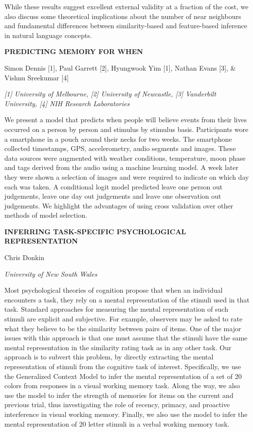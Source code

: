 \documentclass[]{article}
\begin{document}
While these results suggest excellent external validity at a fraction of
the cost, we also discuss some theoretical implications about the number
of near neighbours and fundamental differences between similarity-based
and feature-based inference in natural language concepts.

\textbf{PREDICTING MEMORY FOR WHEN}

Simon Dennis {[}1{]}, Paul Garrett {[}2{]}, Hyungwook Yim {[}1{]},
Nathan Evans {[}3{]}, \& Vishnu Sreekumar {[}4{]}

\emph{{[}1{]} University of Melbourne, {[}2{]} University of Newcastle,
{[}3{]} Vanderbilt University, {[}4{]} NIH Research Laboratories}

We present a model that predicts when people will believe events from
their lives occurred on a person by person and stimulus by stimulus
basis. Participants wore a smartphone in a pouch around their necks for
two weeks. The smartphone collected timestamps, GPS, accelerometry,
audio segments and images. These data sources were augmented with
weather conditions, temperature, moon phase and tags derived from the
audio using a machine learning model. A week later they were shown a
selection of images and were required to indicate on which day each was
taken. A conditional logit model predicted leave one person out
judgements, leave one day out judgements and leave one observation out
judgements. We highlight the advantages of using cross validation over
other methods of model selection.

\textbf{INFERRING TASK-SPECIFIC PSYCHOLOGICAL REPRESENTATION}

Chris Donkin

\emph{University of New South Wales}

Most psychological theories of cognition propose that when an individual
encounters a task, they rely on a mental representation of the stimuli
used in that task. Standard approaches for measuring the mental
representation of such stimuli are explicit and subjective. For example,
observers may be asked to rate what they believe to be the similarity
between pairs of items. One of the major issues with this approach is
that one must assume that the stimuli have the same mental
representation in the similarity rating task as in any other task. Our
approach is to subvert this problem, by directly extracting the mental
representation of stimuli from the cognitive task of interest.
Specifically, we use the Generalized Context Model to infer the mental
representation of a set of 20 colors from responses in a visual working
memory task. Along the way, we also use the model to infer the strength
of memories for items on the current and previous trial, thus
investigating the role of recency, primacy, and proactive interference
in visual working memory. Finally, we also use the model to infer the
mental representation of 20 letter stimuli in a verbal working memory
task.
\end{document}
